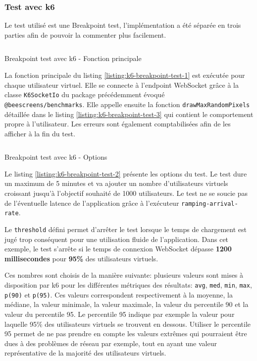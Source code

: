 \subsubsection{Test avec k6}

Le test utilisé est une Breakpoint test, l'implémentation a été séparée en trois parties afin de pouvoir la commenter plus facilement.

\begin{listing}[H]
  \inputminted[linenos]{ts}{assets/figures/breakpoint-test-1.ts}
  \caption{Breakpoint test avec k6 - Fonction principale}
  \label{listing:k6-breakpoint-test-1}
\end{listing}

La fonction principale du listing \ref{listing:k6-breakpoint-test-1} est exécutée pour chaque utilisateur virtuel. Elle se connecte à l'endpoint WebSocket grâce à la classe \texttt{K6SocketIo} du package précédemment évoqué \texttt{\\@beescreens/benchmarks}. Elle appelle ensuite la fonction \texttt{drawMaxRandomPixels} détaillée dans le listing \ref{listing:k6-breakpoint-test-3} qui contient le comportement propre à l'utilisateur. Les erreurs sont également comptabilisées afin de les afficher à la fin du test.

\begin{listing}[H]
  \inputminted[linenos]{ts}{assets/figures/breakpoint-test-2.ts}
  \caption{Breakpoint test avec k6 - Options}
  \label{listing:k6-breakpoint-test-2}
\end{listing}

Le listing \ref{listing:k6-breakpoint-test-2} présente les options du test. Le test dure un maximum de 5 minutes et va ajouter un nombre d'utilisateurs virtuels croissant jusqu'à l'objectif souhaité de 1000 utilisateurs. Le test ne se soucie pas de l'éventuelle latence de l'application grâce à l'exécuteur \texttt{ramping-arrival-rate}.

Le \texttt{threshold} défini permet d'arrêter le test lorsque le temps de chargement est jugé trop conséquent pour une utilisation fluide de l'application. Dans cet exemple, le test s'arrête si le temps de connexion WebSocket dépasse \textbf{1200 millisecondes} pour \textbf{95\%} des utilisateurs virtuels.

Ces nombres sont choisis de la manière suivante: plusieurs valeurs sont mises à disposition par k6 pour les différentes métriques des résultats: \texttt{avg}, \texttt{med}, \texttt{min}, \texttt{max}, \texttt{p(90)} et \texttt{p(95)}. Ces valeurs correspondent respectivement à la moyenne, la médiane, la valeur minimale, la valeur maximale, la valeur du percentile 90 et la valeur du percentile 95. Le percentile 95 indique par exemple la valeur pour laquelle 95\% des utilisateurs virtuels se trouvent en dessous. Utiliser le percentile 95 permet de ne pas prendre en compte les valeurs extrêmes qui pourraient être dues à des problèmes de réseau par exemple, tout en ayant une valeur représentative de la majorité des utilisateurs virtuels.

